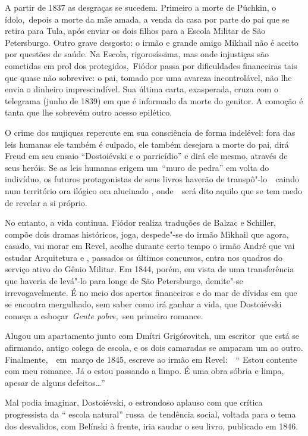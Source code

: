 A partir de 1837 as desgraças se sucedem. Primeiro a morte de Púchkin, o
ídolo,~depois a morte da mãe amada, a venda da casa por parte do pai que
se retira para Tula, após enviar os dois filhos para a Escola Militar de
São Petersburgo. Outro grave desgosto: o irmão e grande amigo Mikhail
não é aceito por questões de saúde. Na Escola, rigorosíssima, mas onde
injustiças são cometidas em prol dos protegidos,~Fiódor passa por
dificuldades financeiras tais que quase não sobrevive: o pai, tomado por
uma avareza incontrolável, não lhe envia o dinheiro imprescindível. Sua
última carta, exasperada, cruza com o telegrama (junho de 1839) em que é
informado da morte do genitor. A comoção é tanta que lhe sobrevém outro
acesso epilético.

O crime dos mujiques repercute em sua consciência de forma indelével:
fora das leis humanas ele também é culpado, ele também desejara a morte
do pai, dirá Freud em seu ensaio ``Dostoiévski e o parricídio'' e dirá
ele mesmo, através de seus heróis. Se as leis humanas erigem um~``muro
de pedra'' em volta do indivíduo, os futuros protagonistas de seus
livros haverão de transpô"-lo~~caindo num território ora ilógico ora
alucinado , onde~~será dito aquilo que se tem medo de revelar a si
próprio.

No entanto, a vida continua. Fiódor realiza traduções de Balzac e
Schiller, compõe dois dramas históricos, joga, despede"-se do irmão
Mikhail que agora, casado, vai morar em Revel, acolhe durante certo
tempo o irmão André que vai estudar Arquitetura e , passados os últimos
concursos, entra nos quadros do serviço ativo do Gênio Militar. Em 1844,
porém, em vista de uma transferência que haveria de levá"-lo para longe
de São Petersburgo, demite"-se irrevogavelmente. É no meio dos apertos
financeiros e do mar de dívidas em que se encontra mergulhado, sem saber
como irá ganhar a vida, que Dostoiévski começa a esboçar~\emph{Gente
pobre,~}seu primeiro romance.

Alugou um apartamento junto com Dmítri Grigórovitch, um escritor~que
está se afirmando, antigo colega de escola, e os dois camaradas se
amparam um ao outro. Finalmente,~~em~março de 1845, escreve ao irmão em
Revel:~~`` Estou contente com meu romance. Já o estou passando a limpo.
É uma obra sóbria e limpa, apesar de alguns defeitos\ldots{}''

Mal podia imaginar, Dostoiévski, o estrondoso aplauso com que crítica
progressista da `` escola natural'' russa~de tendência social, voltada
para o tema dos desvalidos, com Belínski à frente, iria saudar o seu
livro, publicado em 1846.

